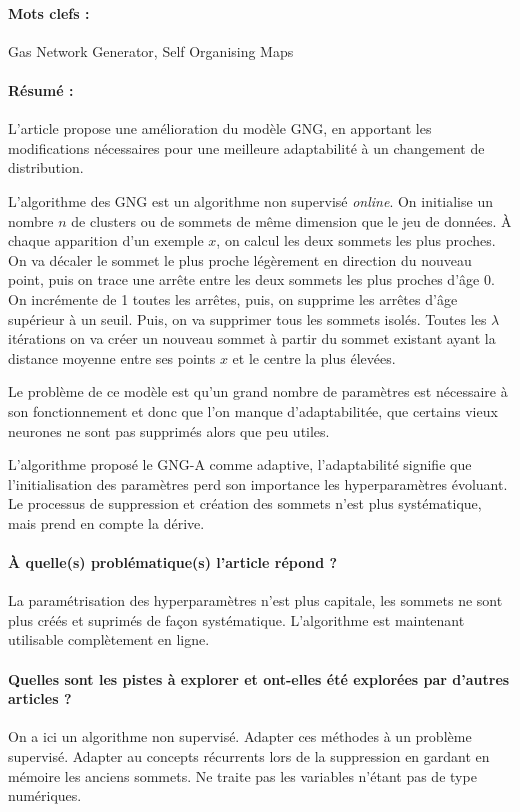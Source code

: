 \documentclass[11pt,a4paper]{report}
\begin{document}
\paragraph{Mots clefs :}Gas Network Generator, Self Organising Maps

\paragraph{Résumé :}L'article propose une amélioration du modèle GNG, en apportant les modifications nécessaires pour une meilleure adaptabilité à un changement de distribution.

L'algorithme des GNG est un algorithme non supervisé \textit{online}. On initialise un nombre $n$ de clusters ou de sommets de même dimension que le jeu de données. À chaque apparition d'un exemple $x$, on calcul les deux sommets les plus proches. On va décaler le sommet le plus proche légèrement en direction du nouveau point, puis on trace une arrête entre les deux sommets les plus proches d'âge 0. On incrémente de 1 toutes les arrêtes, puis, on supprime les arrêtes d'âge supérieur à un seuil. Puis, on va supprimer tous les sommets isolés. Toutes les $\lambda$ itérations on va créer un nouveau sommet à partir du sommet existant ayant la distance moyenne entre ses points $x$ et le centre la plus élevées.

Le problème de ce modèle est qu'un grand nombre de paramètres est nécessaire à son fonctionnement et donc que l'on manque d'adaptabilitée, que certains vieux neurones ne sont pas supprimés alors que peu utiles.

L'algorithme proposé le GNG-A comme adaptive, l'adaptabilité signifie que l'initialisation des paramètres perd son importance les hyperparamètres évoluant. Le processus de suppression et création des sommets n'est plus systématique, mais prend en compte la dérive. 

\paragraph{À quelle(s) problématique(s) l'article répond ? } La paramétrisation des hyperparamètres n'est plus capitale, les sommets ne sont plus créés et suprimés de façon systématique. L'algorithme est maintenant utilisable complètement en ligne.

\paragraph{Quelles sont les pistes à explorer et ont-elles  été explorées par d'autres articles ? } On a ici un algorithme non supervisé. Adapter ces méthodes à un problème supervisé. Adapter au concepts récurrents lors de la suppression en gardant en mémoire les anciens sommets. Ne traite pas les variables n'étant pas de type numériques.
\end{document}
